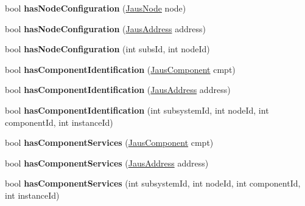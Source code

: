 \begin{DoxyCompactItemize}
\item 
\hypertarget{class_system_tree_a06161e100b6db848049baf1b1797efd4}{bool {\bfseries has\-Node\-Configuration} (\hyperlink{struct_jaus_node_struct}{\-Jaus\-Node} node)}\label{class_system_tree_a06161e100b6db848049baf1b1797efd4}

\item 
\hypertarget{class_system_tree_a867475c1013a5dfafadf3113f0e728dd}{bool {\bfseries has\-Node\-Configuration} (\hyperlink{struct_jaus_address_struct}{\-Jaus\-Address} address)}\label{class_system_tree_a867475c1013a5dfafadf3113f0e728dd}

\item 
\hypertarget{class_system_tree_a5f3d23f7cac1ec82c7310dd2378fc44d}{bool {\bfseries has\-Node\-Configuration} (int subs\-Id, int node\-Id)}\label{class_system_tree_a5f3d23f7cac1ec82c7310dd2378fc44d}

\item 
\hypertarget{class_system_tree_a3658ccd85bd78849e83459b2b5232804}{bool {\bfseries has\-Component\-Identification} (\hyperlink{struct_jaus_component_struct}{\-Jaus\-Component} cmpt)}\label{class_system_tree_a3658ccd85bd78849e83459b2b5232804}

\item 
\hypertarget{class_system_tree_a623f0f6dfbb65e5aeeb5ab9218948244}{bool {\bfseries has\-Component\-Identification} (\hyperlink{struct_jaus_address_struct}{\-Jaus\-Address} address)}\label{class_system_tree_a623f0f6dfbb65e5aeeb5ab9218948244}

\item 
\hypertarget{class_system_tree_a4e68418dce34d355a41fd5cd29f6a1fa}{bool {\bfseries has\-Component\-Identification} (int subsystem\-Id, int node\-Id, int component\-Id, int instance\-Id)}\label{class_system_tree_a4e68418dce34d355a41fd5cd29f6a1fa}

\item 
\hypertarget{class_system_tree_aad2efe12ad5eee8321733bc8140b9318}{bool {\bfseries has\-Component\-Services} (\hyperlink{struct_jaus_component_struct}{\-Jaus\-Component} cmpt)}\label{class_system_tree_aad2efe12ad5eee8321733bc8140b9318}

\item 
\hypertarget{class_system_tree_aa2e1c8886cde3e07ae8cce4c10c67999}{bool {\bfseries has\-Component\-Services} (\hyperlink{struct_jaus_address_struct}{\-Jaus\-Address} address)}\label{class_system_tree_aa2e1c8886cde3e07ae8cce4c10c67999}

\item 
\hypertarget{class_system_tree_aa1b2a9c72f1f77a713a246d041f30e87}{bool {\bfseries has\-Component\-Services} (int subsystem\-Id, int node\-Id, int component\-Id, int instance\-Id)}\label{class_system_tree_aa1b2a9c72f1f77a713a246d041f30e87}


\end{DoxyCompactItemize}
